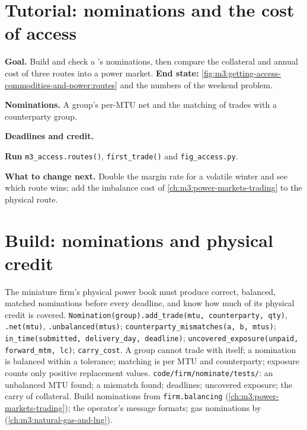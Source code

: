 \section{Tutorial: nominations and the cost of access}\label{tut:m3:getting-access-commodities-and-power:access}

\begin{tutorial}
\textbf{Goal.} Build and check a 's nominations, then compare the collateral and annual cost of
three routes into a power market. \textbf{End state:}
\cref{fig:m3:getting-access-commodities-and-power:routes} and the numbers of the weekend problem.
\begin{tutsteps}
\item \textbf{Nominations.} A group's per-MTU net and the matching of trades with a counterparty group.
\label{lst:m3:getting-access-commodities-and-power:nomination}
\item \textbf{Deadlines and credit.}
\label{lst:m3:getting-access-commodities-and-power:credit}
\item \textbf{Run} \texttt{m3\_access.routes()}, \texttt{first\_trade()} and \texttt{fig\_access.py}.
\end{tutsteps}
\textbf{What to change next.} Double the margin rate for a volatile winter and see which route wins; add the
imbalance cost of \cref{ch:m3:power-markets-trading} to the physical route.
\end{tutorial}

\section{Build: nominations and physical credit}\label{bld:m3:getting-access-commodities-and-power:nominate}

\begin{build}
 The miniature firm's physical power book must produce correct, balanced, matched nominations
before every deadline, and know how much of its physical credit is covered.
 \texttt{Nomination(group).add\_trade(mtu, counterparty, qty)}, \texttt{.net(mtu)},
\texttt{.unbalanced(mtus)}; \texttt{counterparty\_mismatches(a, b, mtus)}; \texttt{in\_time(submitted,
delivery\_day, deadline)}; \texttt{uncovered\_exposure(unpaid, forward\_mtm, lc)}; \texttt{carry\_cost}.
 A group cannot trade with itself; a nomination is balanced within a tolerance; matching is per
MTU and counterparty; exposure counts only positive replacement values.
 \texttt{code/firm/nominate/tests/}: an unbalanced MTU found; a mismatch found;
deadlines; uncovered exposure; the carry of collateral.
 Build nominations from \texttt{firm.balancing} (\cref{ch:m3:power-markets-trading}); the
operator's message formats; gas nominations by  (\cref{ch:m3:natural-gas-and-lng}).
\end{build}

